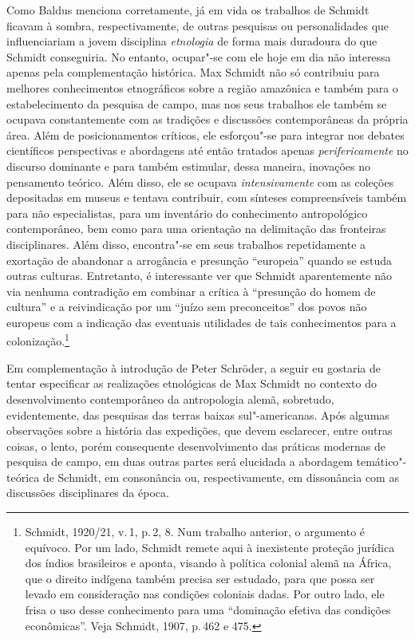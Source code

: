 Como Baldus menciona corretamente, já em vida os trabalhos de Schmidt
ficavam à sombra, respectivamente, de outras pesquisas ou personalidades
que influenciariam a jovem disciplina \textit{etnologia}
de forma mais duradoura do que
Schmidt conseguiria. No entanto, ocupar"-se com ele hoje em dia não
interessa apenas pela complementação histórica. Max Schmidt não só
contribuiu para melhores conhecimentos etnográficos sobre a região
amazônica e também para o estabelecimento da pesquisa de campo, mas nos
seus trabalhos ele também se ocupava constantemente com as tradições e
discussões contemporâneas da própria área. Além de posicionamentos
críticos, ele esforçou"-se para integrar nos debates científicos
perspectivas e abordagens até então tratados apenas \textit{perifericamente} no
discurso dominante e para também estimular, dessa maneira, inovações no
pensamento teórico. Além disso, ele se ocupava \textit{intensivamente} com as
coleções depositadas em museus e tentava contribuir, com sínteses
compreensíveis também para não especialistas, para um inventário do
conhecimento antropológico contemporâneo, bem como para uma orientação
na delimitação das fronteiras disciplinares. Além disso, encontra"-se em
seus trabalhos repetidamente a exortação de abandonar a arrogância e
presunção ``europeia'' quando se estuda outras culturas. Entretanto, é
interessante ver que Schmidt aparentemente não via nenhuma contradição
em combinar a crítica à ``presunção do homem de cultura'' e a
reivindicação por um ``juízo sem preconceitos'' dos povos não europeus
com a indicação das eventuais utilidades de tais conhecimentos para a
colonização.\footnote{Schmidt, 1920/21, v.\,1, p.\,2, 8. Num trabalho
  anterior, o argumento é equívoco. Por um lado, Schmidt remete aqui à
  inexistente proteção jurídica dos índios brasileiros e aponta,
  visando à política colonial alemã na África, que o direito indígena
  também precisa ser estudado, para que possa ser levado em consideração
  nas condições coloniais dadas. Por outro lado, ele frisa o uso desse
  conhecimento para uma ``dominação efetiva das condições econômicas''. Veja Schmidt, 1907, p.\,462 e 475.}

Em complementação à introdução de Peter Schröder, a seguir eu gostaria de
tentar especificar as realizações etnológicas de Max Schmidt no contexto
do desenvolvimento contemporâneo da antropologia alemã, sobretudo,
evidentemente, das pesquisas das terras baixas sul"-americanas. Após
algumas observações sobre a história das expedições, que devem
esclarecer, entre outras coisas, o lento, porém consequente
desenvolvimento das práticas modernas de pesquisa de campo, em duas
outras partes será elucidada a abordagem temático"-teórica de Schmidt, em
consonância ou, respectivamente, em dissonância com as discussões
disciplinares da época.

